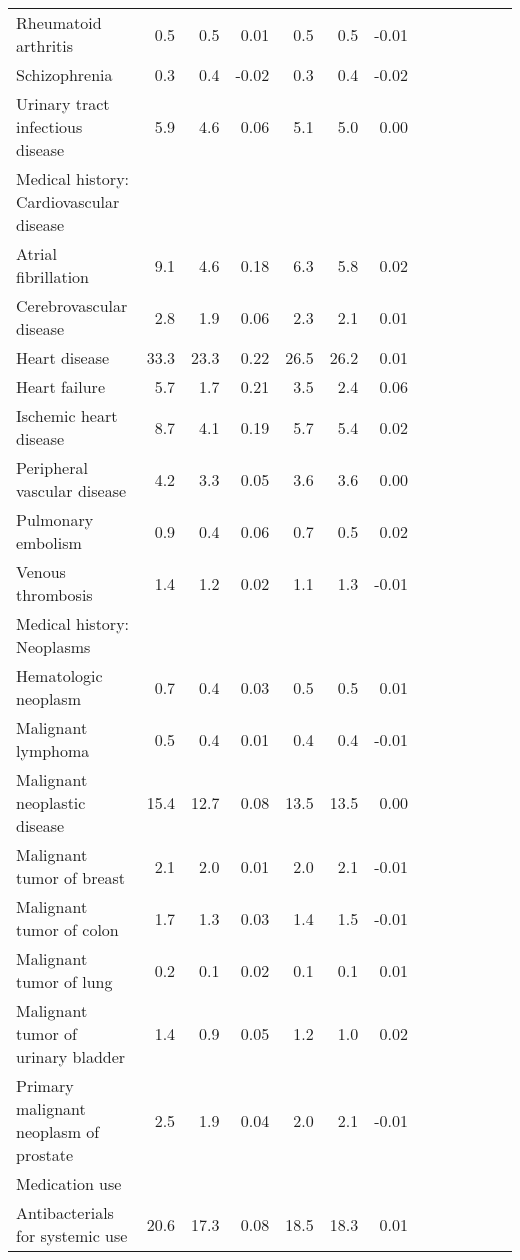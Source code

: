 \documentclass[11pt,]{article}
\begin{document}
\begin{longtable}{lrrrrrrrrrrrr}
      Rheumatoid arthritis &  0.5 &  0.5 &  0.01 &   0.5 &  0.5 & -0.01 \\ 
      Schizophrenia &  0.3 &  0.4 & -0.02 &   0.3 &  0.4 & -0.02 \\ 
      Urinary tract infectious disease &  5.9 &  4.6 &  0.06 &   5.1 &  5.0 &  0.00 \\ 
  Medical history: Cardiovascular disease &    &    &     &     &    &     \\ 
      Atrial fibrillation &  9.1 &  4.6 &  0.18 &   6.3 &  5.8 &  0.02 \\ 
      Cerebrovascular disease &  2.8 &  1.9 &  0.06 &   2.3 &  2.1 &  0.01 \\ 
      Heart disease & 33.3 & 23.3 &  0.22 &  26.5 & 26.2 &  0.01 \\ 
      Heart failure &  5.7 &  1.7 &  0.21 &   3.5 &  2.4 &  0.06 \\ 
      Ischemic heart disease &  8.7 &  4.1 &  0.19 &   5.7 &  5.4 &  0.02 \\ 
      Peripheral vascular disease &  4.2 &  3.3 &  0.05 &   3.6 &  3.6 &  0.00 \\ 
      Pulmonary embolism &  0.9 &  0.4 &  0.06 &   0.7 &  0.5 &  0.02 \\ 
      Venous thrombosis &  1.4 &  1.2 &  0.02 &   1.1 &  1.3 & -0.01 \\ 
  Medical history: Neoplasms &    &    &     &     &    &     \\ 
      Hematologic neoplasm &  0.7 &  0.4 &  0.03 &   0.5 &  0.5 &  0.01 \\ 
      Malignant lymphoma &  0.5 &  0.4 &  0.01 &   0.4 &  0.4 & -0.01 \\ 
      Malignant neoplastic disease & 15.4 & 12.7 &  0.08 &  13.5 & 13.5 &  0.00 \\ 
      Malignant tumor of breast &  2.1 &  2.0 &  0.01 &   2.0 &  2.1 & -0.01 \\ 
      Malignant tumor of colon &  1.7 &  1.3 &  0.03 &   1.4 &  1.5 & -0.01 \\ 
      Malignant tumor of lung &  0.2 &  0.1 &  0.02 &   0.1 &  0.1 &  0.01 \\ 
      Malignant tumor of urinary bladder &  1.4 &  0.9 &  0.05 &   1.2 &  1.0 &  0.02 \\ 
      Primary malignant neoplasm of prostate &  2.5 &  1.9 &  0.04 &   2.0 &  2.1 & -0.01 \\ 
  Medication use &    &    &     &     &    &     \\ 
      Antibacterials for systemic use & 20.6 & 17.3 &  0.08 &  18.5 & 18.3 &  0.01 \\ 

\end{longtable}
\end{document}
